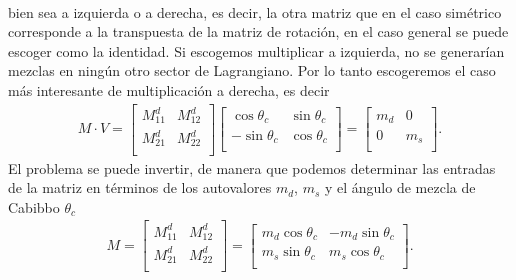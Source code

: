 \begin{frame}
\begin{align}
\end{align}
bien sea a izquierda o a derecha, es decir, la otra matriz que en el caso simétrico corresponde a la transpuesta de la matriz de rotación, en el caso general se puede escoger como la identidad. Si escogemos multiplicar a izquierda, no se generarían mezclas en ningún otro sector de Lagrangiano. Por lo tanto escogeremos el caso más interesante de multiplicación a derecha, es decir
\begin{align}
  M\cdot V=
   \begin{bmatrix}
     M^{d}_{11} & M^{d}_{12} \\
     M^{d}_{21} & M^{d}_{22} \\                                      
  \end{bmatrix}
  \begin{bmatrix}
    \cos\theta_c & \sin\theta_c\\
     -\sin\theta_c & \cos\theta_c  \\
  \end{bmatrix}=
  \begin{bmatrix}
    m_d & 0\\
    0  & m_s\\
  \end{bmatrix}.
\end{align}
El problema se puede invertir, de manera que podemos determinar las entradas de la matriz en términos de los autovalores $m_{d}$, $m_s$ y el ángulo de mezcla de Cabibbo $\theta_c$
\begin{align}
  M=  \begin{bmatrix}
     M^{d}_{11} & M^{d}_{12} \\
     M^{d}_{21} & M^{d}_{22} \\                                      
  \end{bmatrix}=
  \begin{bmatrix}
    {m_d\cos\theta_c}&  -{m_d\sin\theta_c} \\
   {m_s\sin\theta_c } & {m_s\cos\theta_c } \\
  \end{bmatrix}.
\end{align}




\end{frame}

